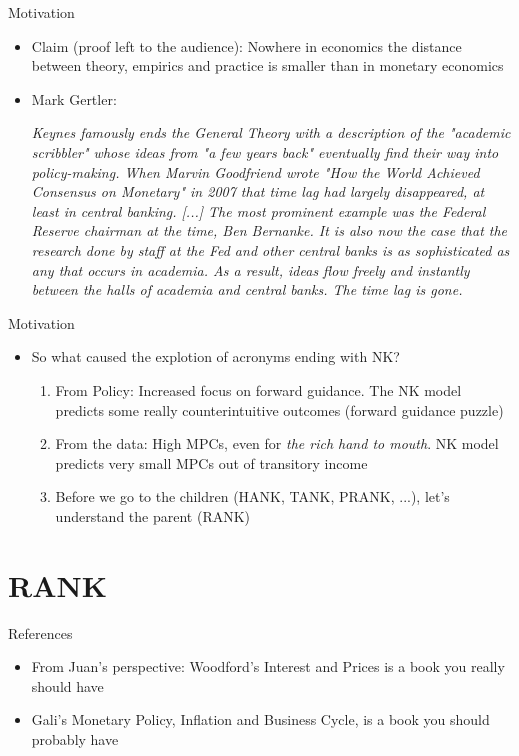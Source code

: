 \documentclass[english,xcolor=svgnames]{beamer}
\begin{document}
\begin{frame}{Motivation}
\begin{itemize}
\item Claim (proof left to the audience): Nowhere in economics the distance between theory, empirics and practice is smaller than in monetary economics
\item Mark Gertler:

\textit{Keynes famously ends the General Theory with a description of the "academic scribbler" whose ideas from "a few years back" eventually find their way into policy-making. When Marvin Goodfriend wrote "How the World Achieved Consensus on Monetary" in 2007 that time lag had largely disappeared, at least in central banking. [...] The most prominent example was the Federal Reserve chairman at the time, Ben
Bernanke. It is also now the case that the research done by staff at the Fed and other central banks is as sophisticated as any that occurs in academia.
As a result, ideas flow freely and instantly between the halls of academia and central banks. The time lag is gone.}

\end{itemize}
\end{frame}

\begin{frame}{Motivation}
\begin{itemize}
\item So what caused the explotion of acronyms ending with NK?
\begin{enumerate}
\item From Policy: Increased focus on forward guidance. The NK model predicts some really counterintuitive outcomes (forward guidance puzzle)
\item From the data: High MPCs, even for \textit{the rich hand to mouth}. NK model predicts very small MPCs out of transitory income
\item Before we go to the children (HANK, TANK, PRANK, ...), let's understand the parent (RANK)
\end{enumerate}
\end{itemize}
\end{frame}




\section{RANK}

\begin{frame}{References}
\begin{itemize}
\item From Juan's perspective: Woodford's Interest and Prices is a book you really should have
\item Gali's Monetary Policy, Inflation and Business Cycle, is a book you should probably have
\end{itemize}
\end{frame}
\end{document}

